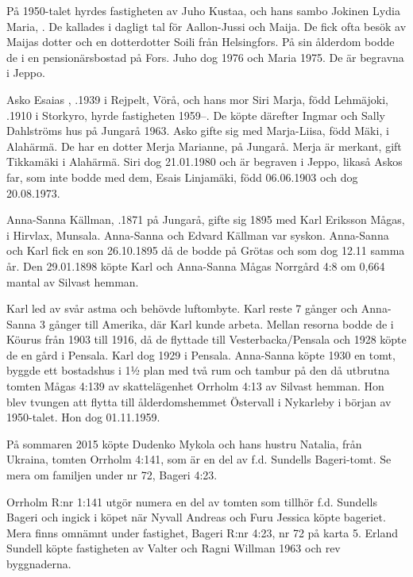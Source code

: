 
På 1950-talet hyrdes fastigheten av  Juho Kustaa,  och hans sambo Jokinen Lydia Maria, . De kallades i dagligt tal för Aallon-Jussi och Maija. De fick ofta besök av Maijas dotter och en dotterdotter Soili från Helsingfors. På sin ålderdom bodde de i en pensionärsbostad på Fors. Juho dog 1976 och Maria 1975. De är 	begravna i Jeppo.

Asko Esaias , .1939 i Rejpelt, Vörå, och hans mor Siri Marja, född Lehmäjoki, .1910 i Storkyro, hyrde fastigheten 1959--. De köpte därefter Ingmar och Sally Dahlströms hus på Jungarå 1963.	Asko gifte sig med Marja-Liisa, född Mäki,  i Alahärmä. De har en dotter Merja Marianne,  på Jungarå. Merja är merkant, gift Tikkamäki i Alahärmä. Siri dog 21.01.1980 och är begraven i Jeppo, likaså Askos far, som inte bodde med dem, Esais Linjamäki, född 06.06.1903 och dog 20.08.1973.


Anna-Sanna Källman, .1871 på Jungarå, gifte sig 1895 med Karl Eriksson Mågas,  i Hirvlax, Munsala. Anna-Sanna och Edvard Källman var syskon. Anna-Sanna och Karl fick en son 26.10.1895 då de bodde på Grötas och som dog 12.11 samma år. Den 29.01.1898 köpte Karl och Anna-Sanna Mågas Norrgård 4:8 om 0,664 mantal av Silvast hemman.

Karl led av svår astma och behövde luftombyte. Karl reste 7 gånger och Anna-Sanna 3 gånger till Amerika, där Karl kunde arbeta. Mellan resorna bodde de i Köurus från 1903 till 1916, då de flyttade till Vesterbacka/Pensala och 1928 köpte de en gård i Pensala. Karl dog 1929 i Pensala.	Anna-Sanna köpte 1930 en tomt, byggde ett bostadshus i 1½ plan med två rum och tambur på den då utbrutna	tomten Mågas 4:139 av skattelägenhet Orrholm 4:13 av Silvast hemman. Hon blev tvungen att flytta till ålderdomshemmet Östervall i Nykarleby i början av 1950-talet. Hon dog 01.11.1959.




På sommaren 2015 köpte Dudenko Mykola och hans hustru Natalia, från Ukraina, tomten Orrholm 4:141, som är en del av f.d. Sundells Bageri-tomt. Se mera om familjen under nr 72, Bageri 4:23.


Orrholm R:nr 1:141 utgör numera en del av tomten som tillhör  f.d. Sundells Bageri och ingick i köpet när  Nyvall Andreas och Furu Jessica köpte bageriet. Mera finns omnämnt under fastighet, Bageri R:nr 4:23, nr 72 på karta 5. Erland Sundell köpte fastigheten av Valter och Ragni Willman 1963 och rev byggnaderna.


